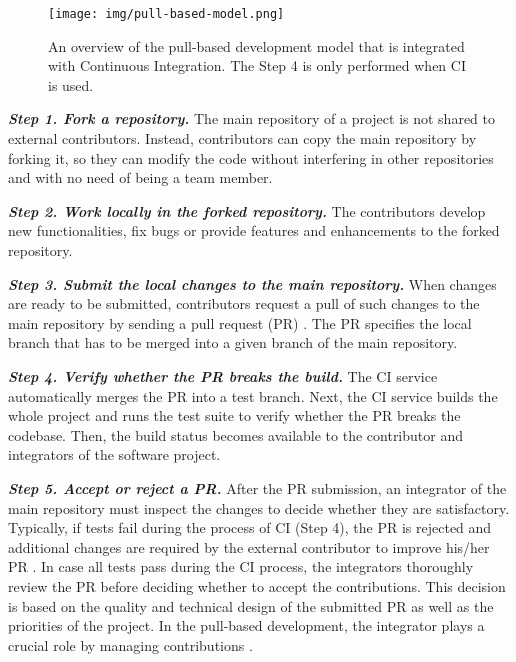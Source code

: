 \begin{figure}[!t]
	\centering
	\texttt{[image: img/pull-based-model.png]}
	\caption{An overview of the pull-based development model that is
	integrated with Continuous Integration. The Step 4 is only performed when CI is used.}
	\label{fig:pull_based_development}
\end{figure}

{\em\textbf{Step 1. Fork a repository.}} The main repository of a project is not shared to external contributors. Instead, contributors can copy the main repository by forking it, so they can modify the code without interfering in other repositories and with no need of being a team member.

{\em\textbf{Step 2. Work locally in the forked repository.}} The contributors develop new functionalities, fix bugs or provide features and enhancements to the forked repository. 

{\em\textbf{Step 3. Submit the local changes to the main repository.}} When changes are ready to be submitted, contributors request a pull of such changes to the main repository by sending a pull request (PR) \citep{Yu2016-cy}. The PR specifies the local branch that has to be merged into a given branch of the main repository.

{\em\textbf{Step 4. Verify whether the PR breaks the build.}} The CI service automatically merges the PR into a test branch. Next, the CI service builds the whole project and runs the test suite to verify whether the PR breaks the codebase. Then, the build status becomes available to the contributor and integrators of the software project.

{\em\textbf{Step 5. Accept or reject a PR.}} 
After the PR submission, an integrator of the main repository must inspect the changes to decide whether they are satisfactory.  Typically, if tests fail during the process of CI (Step 4), the PR is rejected and additional changes are required by the external contributor to improve his/her PR \citep{Yu2016-cy}. In case all tests pass during the CI process, the integrators thoroughly review the PR before deciding whether to accept the contributions. This decision is based on the quality and technical design of the submitted PR as well as the priorities of the project.  In the pull-based development, the integrator plays a crucial role by managing contributions \citep{Gousios2015-ui}.


